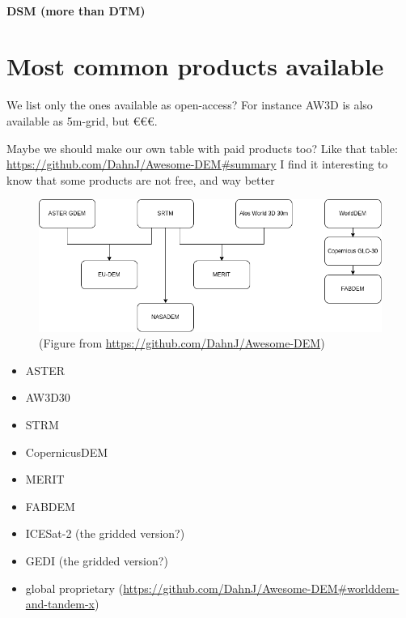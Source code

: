 \paragraph{DSM (more than DTM)}



%
\section[Most common products]{Most common products available}

We list only the ones available as open-access?
For instance AW3D is also available as 5m-grid, but €€€.

Maybe we should make our own table with paid products too? Like that table: \url{https://github.com/DahnJ/Awesome-DEM#summary}
I find it interesting to know that some products are not free, and way better

\begin{figure}
  \centering
  \includegraphics[width=\linewidth]{gdem_inheritance}
  \caption{(Figure from \url{https://github.com/DahnJ/Awesome-DEM})}%
\end{figure}



\begin{itemize}
  \item ASTER
  \item AW3D30
  \item STRM
  \item CopernicusDEM
  \item MERIT
  \item FABDEM
  \item ICESat-2 (the gridded version?)
  \item GEDI (the gridded version?)
  \item global proprietary (\url{https://github.com/DahnJ/Awesome-DEM#worlddem-and-tandem-x})
\end{itemize}

